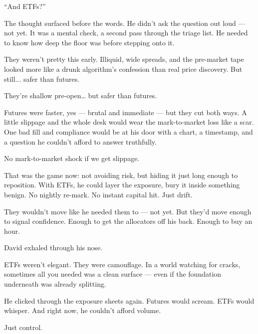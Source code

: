\medskip


“And ETFs?”

The thought surfaced before the words. He didn’t ask the question out loud — not yet. It was a mental check, a second pass through the triage list. He needed to know how deep the floor was before stepping onto it.

They weren’t pretty this early. Illiquid, wide spreads, and the pre-market tape looked more like a drunk algorithm’s confession than real price discovery. But still... safer than futures.

They’re shallow pre-open… but safer than futures.

Futures were faster, yes — brutal and immediate — but they cut both ways. A little slippage and the whole desk would wear the mark-to-market loss like a scar. One bad fill and compliance would be at his door with a chart, a timestamp, and a question he couldn’t afford to answer truthfully.

No mark-to-market shock if we get slippage.

That was the game now: not avoiding risk, but hiding it just long enough to reposition. With ETFs, he could layer the exposure, bury it inside something benign. No nightly re-mark. No instant capital hit. Just drift.

They wouldn’t move like he needed them to — not yet. But they’d move enough to signal confidence. Enough to get the allocators off his back. Enough to buy an hour.

David exhaled through his nose.

ETFs weren’t elegant. They were camouflage. In a world watching for cracks, sometimes all you needed was a clean surface — even if the foundation underneath was already splitting.

He clicked through the exposure sheets again. Futures would scream. ETFs would whisper. And right now, he couldn’t afford volume.

Just control.



\medskip

